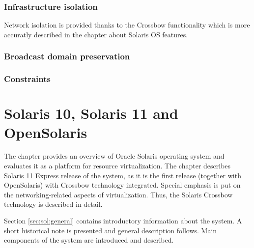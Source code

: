 \documentclass[11pt]{book}
\begin{document}
	

      \subsection{Infrastructure isolation}
	  
		Network isolation is provided thanks to the Crossbow functionality which is more accuratly described in the chapter
		about Solaris OS features. 
		

      \subsection{Broadcast domain preservation}

	  
		

      \subsection{Constraints}


  \chapter{Solaris 10, Solaris 11 and OpenSolaris}
  \label{chap:sol}
  

    The chapter provides an overview of Oracle Solaris operating system and evaluates it as a platform for resource
    virtualization. The chapter describes Solaris 11 Express release of the system, as it is the first release (together
    with OpenSolaris) with Crossbow technology integrated. Special emphasis is put on the networking-related aspects of
    virtualization. Thus, the Solaris Crossbow technology is described in detail.

    Section \ref{sec:sol:general} contains introductory information about the system. A short historical note is
    presented and general description follows. Main components of the system are introduced and described.
    
\end{document}
